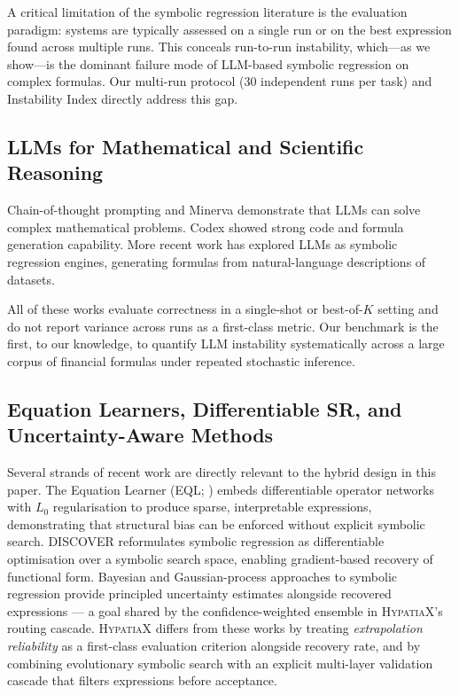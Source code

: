 \documentclass[twoside,11pt]{article}
\begin{document}
A critical limitation of the symbolic regression literature is the evaluation
paradigm: systems are typically assessed on a single run or on the best expression
found across multiple runs.  This conceals run-to-run instability, which---as we
show---is the dominant failure mode of LLM-based symbolic regression on complex
formulas.  Our multi-run protocol (30 independent runs per task) and Instability
Index directly address this gap.

\subsection{LLMs for Mathematical and Scientific Reasoning}
\label{sec:related_llm}

Chain-of-thought prompting \citep{wei2022chain} and Minerva \citep{lewkowycz2022minerva}
demonstrate that LLMs can solve complex mathematical problems.  Codex \citep{chen2021evaluating}
showed strong code and formula generation capability.  More recent work has explored
LLMs as symbolic regression engines, generating formulas from natural-language
descriptions of datasets.

All of these works evaluate correctness in a single-shot or best-of-$K$ setting and
do not report variance across runs as a first-class metric.  Our benchmark is the
first, to our knowledge, to quantify LLM instability systematically across a large
corpus of financial formulas under repeated stochastic inference.

\subsection{Equation Learners, Differentiable SR, and Uncertainty-Aware Methods}
\label{sec:related_eq}

Several strands of recent work are directly relevant to the hybrid design in
this paper.  The Equation Learner (EQL; \citealt{sahoo2018eql}) embeds
differentiable operator networks with $L_0$ regularisation to produce sparse,
interpretable expressions, demonstrating that structural bias can be enforced
without explicit symbolic search.  DISCOVER \citep{liu2022discover} reformulates
symbolic regression as differentiable optimisation over a symbolic search space,
enabling gradient-based recovery of functional form.  Bayesian and
Gaussian-process approaches to symbolic regression \citep{jin2020bayesian}
provide principled uncertainty estimates alongside recovered expressions ---
a goal shared by the confidence-weighted ensemble in \textsc{HypatiaX}'s
routing cascade.  \textsc{HypatiaX} differs from these works by treating
\emph{extrapolation reliability} as a first-class evaluation criterion
alongside recovery rate, and by combining evolutionary symbolic search with an
explicit multi-layer validation cascade that filters expressions before
acceptance.
\end{document}
